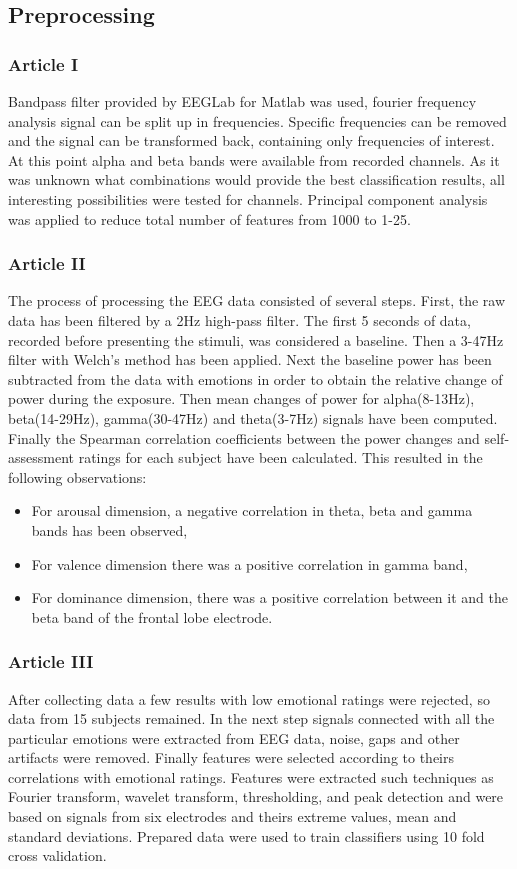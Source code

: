 \documentclass[10pt,journal,compsoc]{IEEEtran}
\begin{document}
\subsection{Preprocessing}

\subsubsection*{Article I}
Bandpass filter provided by EEGLab for Matlab was used, fourier frequency analysis signal can be split up in frequencies. Specific frequencies can be removed and the signal can be transformed back, containing only frequencies of interest. At this point alpha and beta bands were available from recorded channels. As it was unknown what combinations would provide the best classification results, all interesting possibilities were tested for channels. Principal component analysis was applied to reduce total number of features from 1000 to 1-25.

\subsubsection*{Article II}
The process of processing the EEG data consisted of several steps. First, the raw data has been filtered by a 2Hz high-pass filter. The first 5 seconds of data, recorded before presenting the stimuli, was considered a baseline. Then a 3-47Hz filter with Welch's method has been applied. Next the baseline power has been subtracted from the data with emotions in order to obtain the relative change of power during the exposure. Then mean changes of power for alpha(8-13Hz), beta(14-29Hz), gamma(30-47Hz) and theta(3-7Hz) signals have been computed. Finally the Spearman correlation coefficients between the power changes and self-assessment ratings for each subject have been calculated. This resulted in the following observations:
\begin{itemize}
\item{For arousal dimension, a negative correlation in theta, beta and gamma bands has been observed,}
\item{For valence dimension there was a positive correlation in gamma band,}
\item{For dominance dimension, there was a positive correlation between it and the beta band of the frontal lobe electrode.}
\end{itemize}

\subsubsection*{Article III}
After collecting data a few results with low emotional ratings were rejected, so data from 15 subjects remained. In the next step signals connected with all the particular emotions were extracted from EEG data, noise, gaps and other artifacts were removed. Finally features were selected according to theirs correlations with emotional ratings. Features were extracted such techniques as Fourier transform, wavelet transform, thresholding, and peak detection and were based on signals from six electrodes and theirs extreme values, mean and standard deviations. Prepared data were used to train classifiers using 10 fold cross validation.
\end{document}

